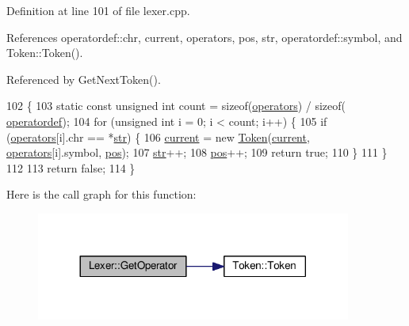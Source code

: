 Definition at line 101 of file lexer.\+cpp.



References operatordef\+::chr, current, operators, pos, str, operatordef\+::symbol, and Token\+::\+Token().



Referenced by Get\+Next\+Token().


\begin{DoxyCode}
102 \{
103     \textcolor{keyword}{static} \textcolor{keyword}{const} \textcolor{keywordtype}{unsigned} \textcolor{keywordtype}{int} count = \textcolor{keyword}{sizeof}(\hyperlink{lex_8h_aaa2a2d46273713612114ac54f424c653}{operators}) / \textcolor{keyword}{sizeof}(
      \hyperlink{structoperatordef}{operatordef});
104     \textcolor{keywordflow}{for} (\textcolor{keywordtype}{unsigned} \textcolor{keywordtype}{int} i = 0; i < count; i++) \{
105         \textcolor{keywordflow}{if} (\hyperlink{lex_8h_aaa2a2d46273713612114ac54f424c653}{operators}[i].chr == *\hyperlink{classLexer_ab2ebe8e8906184cb2e58ec6779c5f9e7}{str}) \{
106             \hyperlink{classLexer_a64f66ae0d280ab2d4f4b8e2ac5d8c4c5}{current} = \textcolor{keyword}{new} \hyperlink{structToken}{Token}(\hyperlink{classLexer_a64f66ae0d280ab2d4f4b8e2ac5d8c4c5}{current}, \hyperlink{lex_8h_aaa2a2d46273713612114ac54f424c653}{operators}[i].symbol, 
      \hyperlink{classLexer_a91a95d9b5edaf25f634fabecaf7f40b5}{pos});
107             \hyperlink{classLexer_ab2ebe8e8906184cb2e58ec6779c5f9e7}{str}++;
108             \hyperlink{classLexer_a91a95d9b5edaf25f634fabecaf7f40b5}{pos}++;
109             \textcolor{keywordflow}{return} \textcolor{keyword}{true};
110         \}
111     \}
112 
113     \textcolor{keywordflow}{return} \textcolor{keyword}{false};
114 \}
\end{DoxyCode}


Here is the call graph for this function\+:\nopagebreak
\begin{figure}[H]
\begin{center}
\leavevmode
\includegraphics[width=293pt]{classLexer_a6d8ab3a715307bf89fdfa8f83879c3cf_cgraph}
\end{center}
\end{figure}




